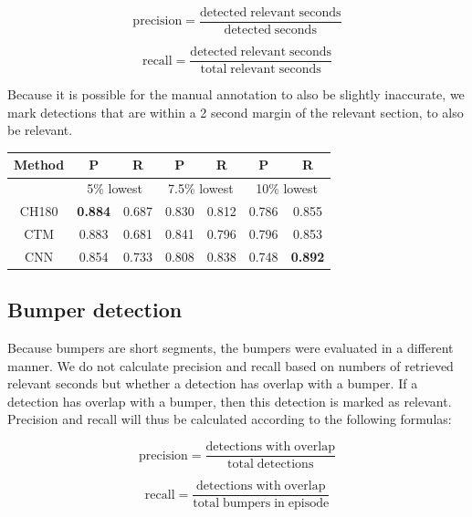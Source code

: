 \documentclass{article}
\begin{document}
\[\mathrm{precision} = \frac{\mathrm{detected\;relevant\;seconds}}{\mathrm{detected\;seconds}}\]

\[\mathrm{recall} = \frac{\mathrm{detected\;relevant\;seconds}}{\mathrm{total\;relevant\;seconds}}\]

Because it is possible for the manual annotation to also be slightly inaccurate, we mark detections that are within a 2 second margin of the relevant section, to also be relevant.

\begin{center}
	\begin{tabular}{ c c c c c c c} 
		\hline
		\textbf{Method} & \textbf{P} & \textbf{R} & \textbf{P} & \textbf{R} & \textbf{P} & \textbf{R} \\
		\hline
		 & \multicolumn{2}{c}{5\% lowest} & \multicolumn{2}{c}{7.5\% lowest} & \multicolumn{2}{c}{10\% lowest} \\
		\hline
		CH180 			& \textbf{0.884} 	& 0.687		& 0.830 	& 0.812 	& 0.786	 	& 0.855 \\
		CTM 			& 0.883 	& 0.681 		& 0.841 	& 0.796 & 0.796 	& 0.853 \\
		CNN 			& 0.854		& 0.733			& 0.808		& 0.838 & 0.748		& \textbf{0.892} \\
		\hline
	\end{tabular}
\end{center}

\subsection{Bumper detection}
Because bumpers are short segments, the bumpers were evaluated in a different manner. We do not calculate precision and recall based on numbers of retrieved relevant seconds but whether a detection has overlap with a bumper. If a detection has overlap with a bumper, then this detection is marked as relevant. Precision and recall will thus be calculated according to the following formulas:

\[\mathrm{precision} = \frac{\mathrm{detections\;with\;overlap}}{\mathrm{total\;detections}}\]

\[\mathrm{recall} = \frac{\mathrm{detections\;with\;overlap}}{\mathrm{total\;bumpers\;in\;episode}}\]
\end{document}
